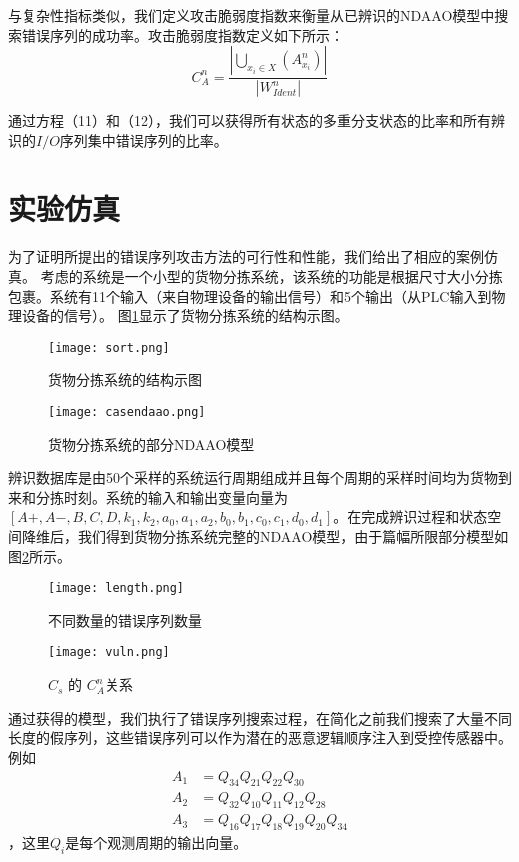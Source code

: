 与复杂性指标类似，我们定义攻击脆弱度指数来衡量从已辨识的NDAAO模型中搜索错误序列的成功率。攻击脆弱度指数定义如下所示：
\begin{equation}
 C_A^n=\dfrac{|\bigcup_{x_i \in X}(A_{x_i}^n)|}{|W_{Ident}^n|} 
 \end{equation}

通过方程（11）和（12），我们可以获得所有状态的多重分支状态的比率和所有辨识的$I/O$序列集中错误序列的比率。
\section{实验仿真}
\label{sec:simulation}

为了证明所提出的错误序列攻击方法的可行性和性能，我们给出了相应的案例仿真。 考虑的系统是一个小型的货物分拣系统，该系统的功能是根据尺寸大小分拣包裹。系统有11个输入（来自物理设备的输出信号）和5个输出（从PLC输入到物理设备的信号）。 图\ref{fig7}显示了货物分拣系统的结构示图。
\begin{figure}[!htb]
  \centering
  \texttt{[image: sort.png]}
  \caption{货物分拣系统的结构示图}
  \label{fig7}
\end{figure}

\begin{figure}[!htb]
  \centering
  \texttt{[image: casendaao.png]}
  \caption{货物分拣系统的部分NDAAO模型}
  \label{fig8}
\end{figure}


辨识数据库是由50个采样的系统运行周期组成并且每个周期的采样时间均为货物到来和分拣时刻。系统的输入和输出变量向量为$[A+,A-,B,C,D,k_1,k_2,a_0,a_1,a_2,b_0,b_1,c_0,c_1,d_0,d_1]$。在完成辨识过程和状态空间降维后，我们得到货物分拣系统完整的NDAAO模型，由于篇幅所限部分模型如图\ref{fig8}所示。
\begin{figure}[!htb]
  \centering
  \texttt{[image: length.png]}
  \caption{不同数量的错误序列数量}
  \label{fig9}
\end{figure}

\begin{figure}[!htb]
  \centering
  \texttt{[image: vuln.png]}
  \caption{$C_s$ 的 $C_A^n$关系}
  \label{fig10}
\end{figure}

通过获得的模型，我们执行了错误序列搜索过程，在简化之前我们搜索了大量不同长度的假序列，这些错误序列可以作为潜在的恶意逻辑顺序注入到受控传感器中。例如\[\begin{split} A_1&=Q_{34}Q_{21}Q_{22}Q_{30}\\A_2&=Q_{32}Q_{10}Q_{11}Q_{12}Q_{28}\\A_3&=Q_{16}Q_{17}Q_{18}Q_{19}Q_{20}Q_{34} \end{split}\]，这里$Q_i$是每个观测周期的输出向量。\\

